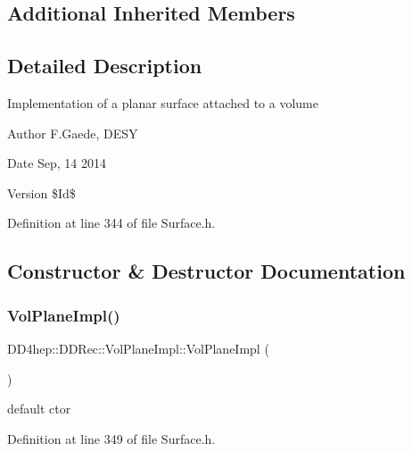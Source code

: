 \subsection*{Additional Inherited Members}


\subsection{Detailed Description}
Implementation of a planar surface attached to a volume \begin{DoxyAuthor}{Author}
F.\+Gaede, D\+E\+SY 
\end{DoxyAuthor}
\begin{DoxyDate}{Date}
Sep, 14 2014 
\end{DoxyDate}
\begin{DoxyVersion}{Version}
\$\+Id\$ 
\end{DoxyVersion}


Definition at line 344 of file Surface.\+h.



\subsection{Constructor \& Destructor Documentation}
\hypertarget{class_d_d4hep_1_1_d_d_rec_1_1_vol_plane_impl_a37e60d5d920d384a03463e2870293306}{}\label{class_d_d4hep_1_1_d_d_rec_1_1_vol_plane_impl_a37e60d5d920d384a03463e2870293306} 
\subsubsection{\texorpdfstring{Vol\+Plane\+Impl()}{VolPlaneImpl()}\hspace{0.1cm}{\footnotesize\ttfamily [1/2]}}
{\footnotesize\ttfamily D\+D4hep\+::\+D\+D\+Rec\+::\+Vol\+Plane\+Impl\+::\+Vol\+Plane\+Impl (\begin{DoxyParamCaption}{ }\end{DoxyParamCaption})\hspace{0.3cm}{\ttfamily [inline]}}



default c\textquotesingle{}tor 



Definition at line 349 of file Surface.\+h.

